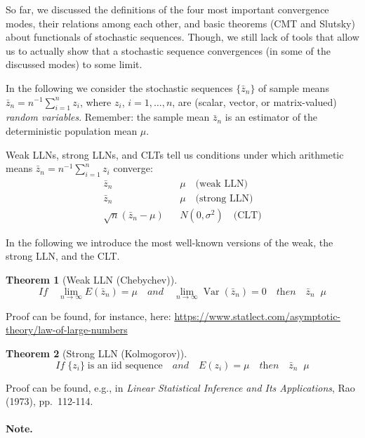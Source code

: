 \documentclass[
  14pt,
]{memoir}
\DeclareMathOperator{\V}{\operatorname{Var}}
\DeclareMathOperator{\toprob}{\overset{p}{\longrightarrow}}
\DeclareMathOperator{\toas}{\overset{a.s.}{\longrightarrow}}
\DeclareMathOperator{\todistr}{\overset{d}{\longrightarrow}}
\newtheorem{theorem}{Theorem}[section]
\begin{document}
So far, we discussed the definitions of the four most important convergence modes, their relations among each other, and basic theorems (CMT and Slutsky) about functionals of stochastic sequences. Though, we still lack of tools that allow us to actually show that a stochastic sequence convergences (in some of the discussed modes) to some limit.

In the following we consider the stochastic sequences \(\{\bar{z}_n\}\) of sample means \(\bar{z}_n=n^{-1}\sum_{i=1}^nz_i\), where \(z_i\), \(i=1,\dots,n\), are (scalar, vector, or matrix-valued) \emph{random variables}. Remember: the sample mean \(\bar{z}_n\) is an estimator of the deterministic population mean \(\mu\).

Weak LLNs, strong LLNs, and CLTs tell us conditions under which arithmetic means \(\bar{z}_n=n^{-1}\sum_{i=1}^nz_i\) converge:
\begin{eqnarray*}
  \bar{z}_n&\toprob&\mu\quad\text{(weak LLN)}\\
  \bar{z}_n&\toas&\mu\quad\text{(strong LLN)}\\
  \sqrt{n}(\bar{z}_n-\mu)&\todistr&N(0,\sigma^2)\quad\text{(CLT)}
\end{eqnarray*}

In the following we introduce the most well-known versions of the weak, the strong LLN, and the CLT.

\bigskip

\begin{theorem}[Weak LLN (Chebychev)]\label{WLLN1}
$$\textit{If}\quad\lim_{n\to\infty} E(\bar{z}_n)=\mu\quad\textit{and}\quad\lim_{n\to\infty}\V(\bar{z}_n)=0\quad\textit{then}\quad\bar{z}_n\toprob\mu$$
\end{theorem}

\noindent Proof can be found, for instance, here: \url{https://www.statlect.com/asymptotic-theory/law-of-large-numbers}

\bigskip

\begin{theorem}[Strong LLN (Kolmogorov)]\label{SLLN1}
$$\textit{If}\;\{z_i\}\;\text{is an iid~sequence}\quad\textit{and}\quad E(z_i)=\mu\quad\textit{then}\quad\bar{z}_n\toas\mu$$
\end{theorem}

\noindent Proof can be found, e.g., in \textit{Linear Statistical Inference and Its Applications}, Rao (1973), pp.~112-114.

\paragraph*{Note.}
\end{document}
